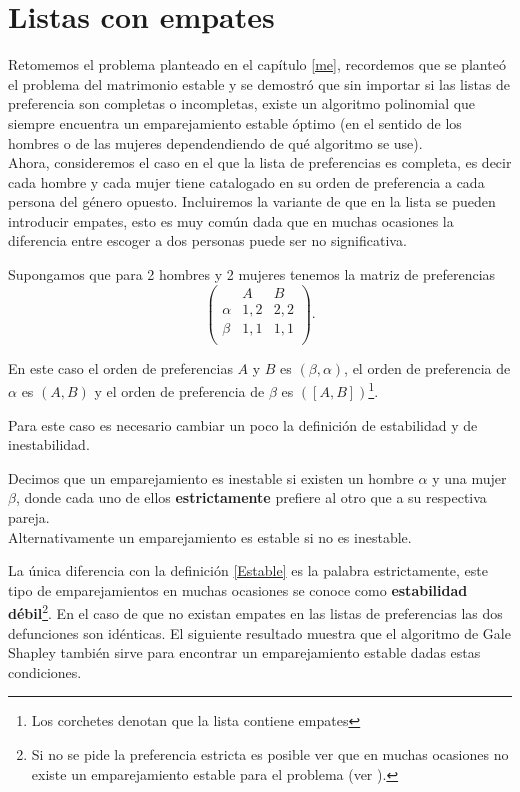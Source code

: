 \chapter{Listas con empates}

Retomemos el problema planteado en el capítulo \ref{me}, recordemos que se planteó el problema del matrimonio estable y se demostró que sin importar si las listas de preferencia son completas o incompletas, existe un algoritmo polinomial que siempre encuentra un emparejamiento estable óptimo (en el sentido de los hombres o de las mujeres dependendiendo de qué algoritmo se use). \\

Ahora, consideremos el caso en el que la lista de preferencias es completa, es decir cada hombre y cada mujer tiene catalogado en su orden de preferencia a cada persona del género opuesto. Incluiremos la variante de que en la lista se pueden introducir empates, esto es muy común dada que en muchas ocasiones la diferencia entre escoger a dos personas puede ser no significativa. 

\begin{eje}{\cite{Verde}}
\label{ejemplo empates}
Supongamos que para 2 hombres y 2 mujeres tenemos la matriz de preferencias 
$$\begin{pmatrix}
& A & B \\
\alpha & 1,2 & 2,2 \\
\beta & 1,1 & 1,1\\
\end{pmatrix}.$$

En este caso el orden de preferencias $A$ y $B$ es $(\beta, \alpha)$, el orden de preferencia de $\alpha$ es $(A,B)$ y el orden de preferencia de $\beta$ es $([A,B])$\footnote{Los corchetes denotan que la lista contiene empates}.
\fin
\end{eje}

Para este caso es necesario cambiar un poco la definición de estabilidad y de inestabilidad. 

\begin{dfn}{\cite{Verde}}
\label{estricto}
Decimos que un emparejamiento es inestable si existen un hombre $\alpha$ y una mujer $\beta$, donde cada uno de ellos \textbf{estrictamente} prefiere al otro que a su respectiva pareja. \\
Alternativamente un emparejamiento es estable si no es inestable.
\end{dfn}

La única diferencia con la definición \ref{Estable} es la palabra estrictamente, este tipo de emparejamientos en muchas ocasiones se conoce como \textbf{estabilidad débil}\footnote{Si no se pide la preferencia estricta es posible ver que en muchas ocasiones no existe un emparejamiento estable para el problema (ver \cite{Verde}).}. En el caso de que no existan empates en las listas de preferencias las dos defunciones son idénticas. El siguiente resultado muestra que el algoritmo de Gale Shapley también sirve para encontrar un emparejamiento estable dadas estas condiciones.

